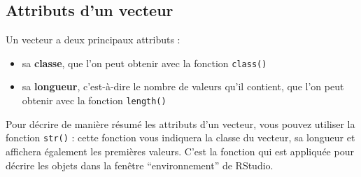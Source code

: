 \documentclass[
]{book}
\providecommand{\tightlist}{%
  \setlength{\itemsep}{0pt}\setlength{\parskip}{0pt}}
\begin{document}
\subsection{Attributs d'un vecteur}\label{attributs-dun-vecteur}

Un vecteur a deux principaux attributs :

\begin{itemize}
\tightlist
\item
  sa \textbf{classe}, que l'on peut obtenir avec la fonction \texttt{class()}
\item
  sa \textbf{longueur}, c'est-à-dire le nombre de valeurs qu'il contient, que l'on peut obtenir avec la fonction \texttt{length()}
\end{itemize}

Pour décrire de manière résumé les attributs d'un vecteur, vous pouvez utiliser la fonction \texttt{str()} : cette fonction vous indiquera la classe du vecteur, sa longueur et affichera également les premières valeurs. C'est la fonction qui est appliquée pour décrire les objets dans la fenêtre ``environnement'' de RStudio.
\end{document}
